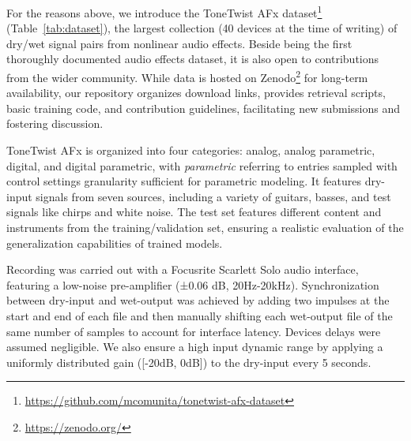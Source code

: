 For the reasons above, we introduce the ToneTwist AFx dataset\footnote{\url{https://github.com/mcomunita/tonetwist-afx-dataset}} (Table~\ref{tab:dataset}), the largest collection (40 devices at the time of writing) of dry/wet signal pairs from nonlinear audio effects.
Beside being the first thoroughly documented audio effects dataset, it is also open to contributions from the wider community.
While data is hosted on Zenodo\footnote{\url{https://zenodo.org/}} for long-term availability, 
our repository organizes download links, provides retrieval scripts, basic training code, and contribution guidelines, facilitating new submissions and fostering discussion.

ToneTwist AFx is organized into four categories: analog, analog parametric, digital, and digital parametric, with \textit{parametric} referring to entries sampled with control settings granularity sufficient for parametric modeling.
It features dry-input signals from seven sources, including a variety of guitars, basses, and test signals like chirps and white noise.
The test set features different content and instruments from the training/validation set, ensuring a realistic evaluation of the generalization capabilities of trained models.

Recording was carried out with a Focusrite Scarlett Solo audio interface, featuring a low-noise pre-amplifier (±0.06 dB, 20Hz-20kHz). 
Synchronization between dry-input and wet-output was achieved by adding two impulses at the start and end of each file and then manually shifting each wet-output file of the same number of samples to account for interface latency.
Devices delays were assumed negligible.
We also ensure a high input dynamic range by applying a uniformly distributed gain ([-20dB, 0dB]) to the dry-input every 5 seconds. 



